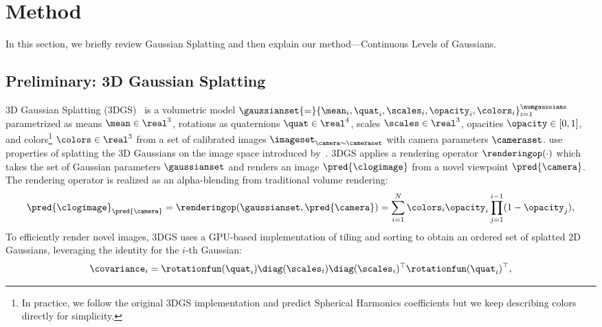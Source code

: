 \section{Method}

  In this section, we briefly review Gaussian Splatting and then explain our
  method---Continuous Levels of Gaussians.


  \subsection{Preliminary: 3D Gaussian Splatting}

    3D Gaussian Splatting (3DGS)~\cite{kerbl20233d}
    is a volumetric model $\gaussianset{=}\{\mean_i,\quat_i, \scales_i, \opacity_i, \colors_i\}_{i=1}^{\numgaussians}$
    parametrized as means $\mean \in \real^3$,
    rotations as quaternions $\quat \in \real^4$,
    scales $\scales \in \real^3$,
    opacities $\opacity \in [0, 1]$,
    and colors\footnote{In practice, we follow the original 3DGS implementation and predict Spherical Harmonics coefficients but we keep describing colors directly for simplicity.} $\colors \in \real^3$
    from a set of calibrated images $\imageset_{\camera\sim\cameraset}$ with camera parameters $\cameraset$.
    \citet{kerbl20233d} use properties of splatting the 3D Gaussians on the image space introduced by~\citet{zwicker2001ewa}. %
    3DGS applies a rendering operator $\renderingop(\cdot)$ which takes the set of Gaussian parameters $\gaussianset$ and renders an image $\pred{\clogimage}$ from a novel viewpoint $\pred{\camera}$.
    The rendering operator is realized as an alpha-blending from traditional volume rendering:
    \begin{equation}
      \label{eq:clog-rendering-image}
      \pred{\clogimage}_{\pred{\camera}} = \renderingop(\gaussianset, \pred{\camera}) = \sum_{i=1}^N \colors_i \opacity_i \prod_{j=1}^{i-1} (1 - \opacity_j),
    \end{equation}
    To efficiently render novel images, 3DGS uses a GPU-based implementation of tiling and sorting to obtain an ordered set of splatted 2D Gaussians, leveraging the identity for the $i$-th Gaussian:
    \begin{equation*}
      \covariance_i = \rotationfun(\quat_i)\diag(\scales_i)\diag(\scales_i)^\top\rotationfun(\quat_i)^\top,
    \end{equation*}
